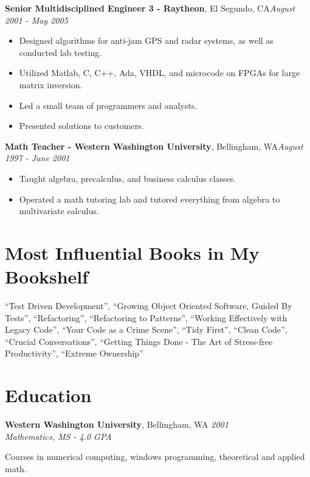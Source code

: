 \documentclass[letter,11pt]{article}
\newenvironment{noindentblock}{%
  \begin{list}{}{%
    \setlength{\leftmargin}{.25in} %
    \setlength{\rightmargin}{0in} %
    \setlength{\topsep}{0pt} %
    \setlength{\parsep}{0pt} %
  }
  \item[]}{\end{list}}
\begin{document}
\pagebreak
\noindent
\textbf{Senior Multidisciplined Engineer 3 - Raytheon}, El Segundo, CA\hfill \textit{August 2001 - May 2005}
\begin{itemize}[leftmargin=*,itemsep=0pt, parsep=0pt,label=$\diamond$]
\item Designed algorithms for anti-jam GPS and radar systems, as well as conducted lab testing.
\item Utilized Matlab, C, C++, Ada, VHDL, and microcode on FPGAs for large matrix inversion.
\item Led a small team of programmers and analysts.
\item Presented solutions to customers.
\end{itemize}

\noindent
\textbf{Math Teacher - Western Washington University}, Bellingham, WA\hfill \textit{August 1997 - June 2001}
\begin{itemize}[leftmargin=*,itemsep=0pt, parsep=0pt,label=$\diamond$]
\item Taught algebra, precalculus, and business calculus classes.
\item Operated a math tutoring lab and tutored everything from algebra to multivariate calculus.
\end{itemize}

\section*{Most Influential Books in My  Bookshelf}
``Test Driven Development'', ``Growing Object Oriented Software, Guided By Tests'', ``Refactoring'', ``Refactoring to Patterns'', ``Working Effectively with Legacy Code'', ``Your Code as a Crime Scene'', ``Tidy First'', ``Clean Code'', ``Crucial Conversations'', ``Getting Things Done - The Art of Stress-free Productivity'', ``Extreme Ownership''

\section*{Education}

\noindent
\textbf{Western Washington University}, Bellingham, WA \hfill \textit{2001}\\
\textit{Mathematics, MS - 4.0 GPA} 
\begin{noindentblock}
Courses in numerical computing, windows programming, theoretical and applied math.
\end{noindentblock}
\end{document}
